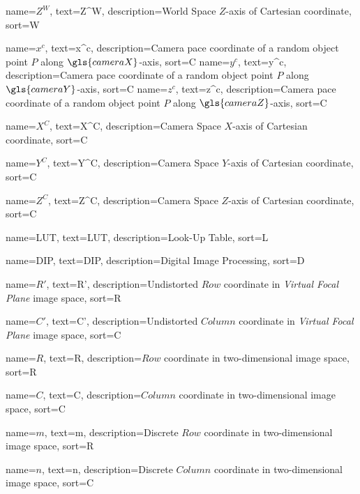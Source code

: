 %
{%
  name={$Z^W$},
  text={Z^W},
  description={World Space $Z$-axis of Cartesian coordinate},
  sort={W}
}

%
{%
  name={$x^c$},
  text={x^c},
  description={Camera pace coordinate of a random object point $P$ along $\gls{cameraX}$-axis},
  sort={C}
}
%
{%
  name={$y^c$},
  text={y^c},
  description={Camera pace coordinate of a random object point $P$ along $\gls{cameraY}$-axis},
  sort={C}
}
%
{%
  name={$z^c$},
  text={z^c},
  description={Camera pace coordinate of a random object point $P$ along $\gls{cameraZ}$-axis},
  sort={C}
}

%
{%
  name={$X^C$},
  text={X^C},
  description={Camera Space $X$-axis of Cartesian coordinate},
  sort={C}
}

%
{%
  name={$Y^C$},
  text={Y^C},
  description={Camera Space $Y$-axis of Cartesian coordinate},
  sort={C}
}

%
{%
  name={$Z^C$},
  text={Z^C},
  description={Camera Space $Z$-axis of Cartesian coordinate},
  sort={C}
}

%
{%
  name={LUT},
  text={LUT},
  description={Look-Up Table},
  sort={L}
}

%
{%
  name={DIP},
  text={DIP},
  description={Digital Image Processing},
  sort={D}
}

%
{%
  name={$R'$},
  text={R'},
  description={Undistorted $Row$ coordinate in \emph{Virtual Focal Plane} image space},
  sort={R}
}

%
{%
  name={$C'$},
  text={C'},
  description={Undistorted $Column$ coordinate in \emph{Virtual Focal Plane} image space},
  sort={C}
}

%
{%
  name={$R$},
  text={R},
  description={$Row$ coordinate in two-dimensional image space},
  sort={R}
}

%
{%
  name={$C$},
  text={C},
  description={$Column$ coordinate in two-dimensional image space},
  sort={C}
}

%
{%
  name={$m$},
  text={m},
  description={Discrete $Row$ coordinate in two-dimensional image space},
  sort={R}
}

%
{%
  name={$n$},
  text={n},
  description={Discrete $Column$ coordinate in two-dimensional image space},
  sort={C}
}


